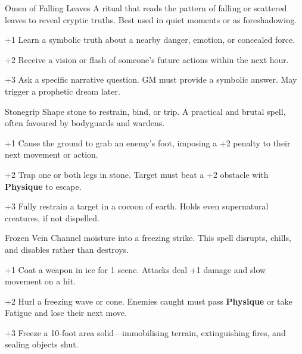 \begin{WyrdSpell}[Divination]{Omen of Falling Leaves}
    A ritual that reads the pattern of falling or scattered leaves to reveal cryptic truths. Best used in quiet moments or as foreshadowing.

    \begin{WyrdSpellBlock}
        \item[+1] Learn a symbolic truth about a nearby danger, emotion, or concealed force.
        \item[+2] Receive a vision or flash of someone’s future actions within the next hour.
        \item[+3] Ask a specific narrative question. GM must provide a symbolic answer. May trigger a prophetic dream later.
    \end{WyrdSpellBlock}
\end{WyrdSpell}

\begin{WyrdSpell}[Elemental]{Stonegrip}
    Shape stone to restrain, bind, or trip. A practical and brutal spell, often favoured by bodyguards and wardens.

    \begin{WyrdSpellBlock}
        \item[+1] Cause the ground to grab an enemy’s foot, imposing a +2 penalty to their next movement or action.
        \item[+2] Trap one or both legs in stone. Target must beat a +2 obstacle with \textbf{Physique} to escape.
        \item[+3] Fully restrain a target in a cocoon of earth. Holds even supernatural creatures, if not dispelled.
    \end{WyrdSpellBlock}
\end{WyrdSpell}

\begin{WyrdSpell}[Elemental]{Frozen Vein}
    Channel moisture into a freezing strike. This spell disrupts, chills, and disables rather than destroys.

    \begin{WyrdSpellBlock}
        \item[+1] Coat a weapon in ice for 1 scene. Attacks deal +1 damage and slow movement on a hit.
        \item[+2] Hurl a freezing wave or cone. Enemies caught must pass \textbf{Physique} or take Fatigue and lose their next move.
        \item[+3] Freeze a 10-foot area solid—immobilising terrain, extinguishing fires, and sealing objects shut.
    \end{WyrdSpellBlock}
\end{WyrdSpell}

